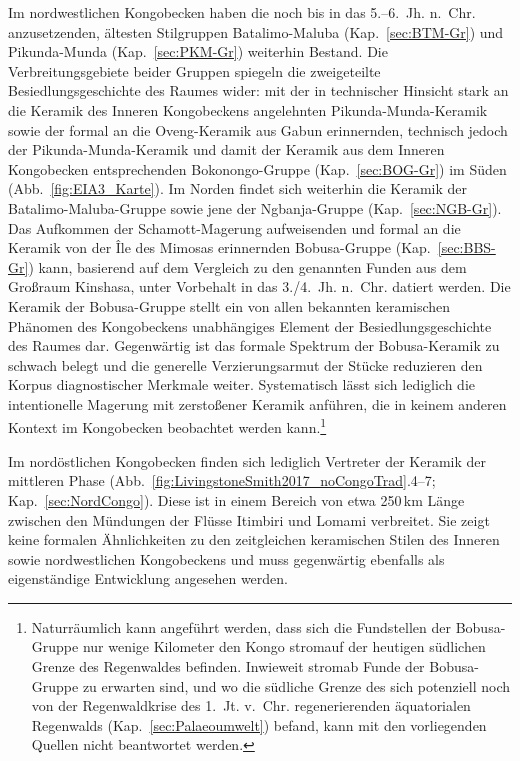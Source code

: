 Im nordwestlichen Kongobecken haben die noch bis in das 5.--6.~Jh. n.~Chr. anzusetzenden, ältesten Stilgruppen Batalimo-Maluba (Kap.~\ref{sec:BTM-Gr}) und Pikunda-Munda (Kap.~\ref{sec:PKM-Gr}) weiterhin Bestand. Die Verbreitungsgebiete beider Gruppen spiegeln die zweigeteilte Besiedlungsgeschichte des Raumes wider: mit der in technischer Hinsicht stark an die Keramik des Inneren Kongobeckens angelehnten Pikunda-Munda-Keramik sowie der formal an die Oveng-Keramik aus Gabun erinnernden, technisch jedoch der Pikunda-Munda-Keramik und damit der Keramik aus dem Inneren Kongobecken entsprechenden Bokonongo-Gruppe (Kap.~\ref{sec:BOG-Gr}) im Süden (Abb.~\ref{fig:EIA3_Karte}). Im Norden findet sich weiterhin die Keramik der Batalimo-Maluba-Gruppe sowie jene der \mbox{Ngbanja}-Gruppe (Kap.~\ref{sec:NGB-Gr}). Das Aufkommen der Schamott-Magerung aufweisenden und formal an die Keramik von der Île des Mimosas erinnernden Bobusa-Gruppe (Kap.~\ref{sec:BBS-Gr}) kann, basierend auf dem Vergleich zu den genannten Funden aus dem Großraum Kinshasa, unter Vorbehalt in das 3./4.~Jh. n.~Chr. datiert werden. Die Keramik der Bobusa-Gruppe stellt ein von allen bekannten keramischen Phänomen des Kongobeckens unabhängiges Element der Besiedlungsgeschichte des Raumes dar. Gegenwärtig ist das formale Spektrum der Bobusa-Keramik zu schwach belegt und die generelle Verzierungsarmut der Stücke reduzieren den Korpus diagnostischer Merkmale weiter. Systematisch lässt sich lediglich die intentionelle Magerung mit zerstoßener Keramik anführen, die in keinem anderen Kontext im Kongobecken beobachtet werden kann.\footnote{Naturräumlich kann angeführt werden, dass sich die Fundstellen der Bobusa-Gruppe nur wenige Kilometer den Kongo stromauf der heutigen südlichen Grenze des Regenwaldes befinden. Inwieweit stromab Funde der Bobusa-Gruppe zu erwarten sind, und wo die südliche Grenze des sich potenziell noch von der Regenwaldkrise des 1.~Jt. v.~Chr. regenerierenden äquatorialen Regenwalds (Kap.~\ref{sec:Palaeoumwelt}) befand, kann mit den vorliegenden Quellen nicht beantwortet werden.}

Im nordöstlichen Kongobecken finden sich lediglich Vertreter der Keramik der mittleren Phase (Abb.~\ref{fig:LivingstoneSmith2017_noCongoTrad}.4--7; Kap.~\ref{sec:NordCongo}). Diese ist in einem Bereich von etwa 250\,km Länge zwischen den Mündungen der Flüsse Itimbiri und Lomami verbreitet. Sie zeigt keine formalen Ähnlichkeiten zu den zeitgleichen keramischen Stilen des Inneren sowie nordwestlichen Kongobeckens und muss gegenwärtig ebenfalls als eigenständige Entwicklung angesehen werden.


